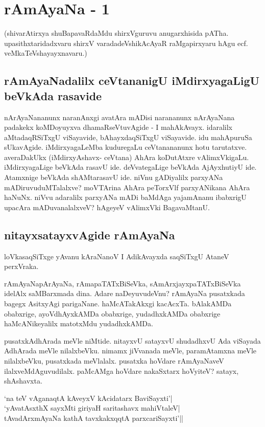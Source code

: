 \chapter{rAmAyaNa - 1}

(shivarAtirxya shuBapavaRdaMdu shirxVguruvu anugarxhisida pATha. upasithxtaridadxvaru shirxV varadadeVshikAcAyaR raMgapirxyaru hAgu ecf. veMkaTeVshayayxnavaru.)

\section*{rAmAyaNadalilx  ceVtananigU iMdirxyagaLigU beVkAda rasavide}

nArAyaNananunx naranAnxgi avatAra mADisi narananunx  nArAyaNana padakekx koMDoyuyxva dhamaRseVtuvAgide  - I mahAkAvayx. idaralilx aMtadaqRSiTxgU viSayavide, bAhayxdaqSiTxgU viSayavide. idu mahApuruSa sUkavAgide. iMdirxyagaLeMba kuduregaLu ceVtanananunx hotu tarutatxve. averaDakUkx (iMdirxyAshavx- ceVtana) AhAra koDutAtxre vAlimxVkigaLu. iMdirxyagaLige beVkAda rasavU ide. deVvategaLige beVkAda AjAyxhutiyU ide. Atamxnige beVkAda shAMtarasavU ide. niVnu gADiyalilx parxyANa mADiruvuduMTalalxve? moVTArina AhAra peTorxVlf parxyANikana AhAra haNuNx. niVvu adaralilx parxyANa mADi baMdAga  yajamAnanu ibabxrigU upacAra mADuvanalalxveV? hAgeyeV vAlimxVki BagavaMtanU. 

\section*{nitayxsatayxvAgide rAmAyaNa}

loVkasaqSiTxge yAvanu kAraNanoV I AdikAvayxda saqSiTxgU AtaneV perxVraka.

rAmAyaNapArAyaNa, rAmapaTATxBiSeVka, sAmArxjayxpaTATxBiSeVka idelAlx saMBarxmada dina. Adare naDeyuvudeVnu? rAmAyaNa pusatxkada bagegx AsitxyAgi parigaNane. haMcATakAkxgi kacAcxTa. bAlakAMDa obabxrige, ayoVdhAyxkAMDa obabxrige, yudadhxkAMDa obabxrige haMcANikeyalilx matotxMdu yudadhxkAMDa. 

pusatxkAdhArada meVle niMtide. nitayxvU satayxvU shudadhxvU Ada viSayada AdhArada meVle nilalxbeVku. nimamx jiVvanada meVle, paramAtamxna meVle nilalxbeVku, pusatxkada meVlalalx. pusatxka hoVdare rAmAyaNaveV ilalxveMdAguvudilalx. paMcAMga hoVdare nakaSxtarx hoVyiteV? satayx, shAshavxta. 

\begin{shloka}
`na teV vAganaqtA kAveyxV kAcidatarx BaviSayxti'|\label{209}\\
`yAvatAsxthX sayxMti giriyaH saritashavx mahiVtaleV|\label{210b}\\
tAvadArxmAyaNa kathA tavxkakxqqtA parxcariSayxti'||
\end{shloka}

